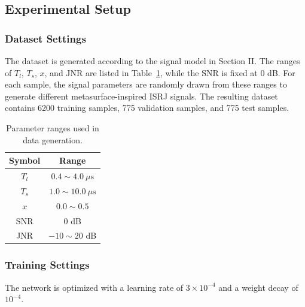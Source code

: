 \documentclass[conference]{IEEEtran}
\begin{document}
\subsection{Experimental Setup}
\subsubsection{Dataset Settings}
The dataset is generated according to the signal model in Section II. The ranges of $T_l$, $T_s$, $x$, and JNR are listed in Table~\ref{tab:data_ranges}, while the SNR is fixed at $0$ dB. For each sample, the signal parameters are randomly drawn from these ranges to generate different metasurface-inspired ISRJ signals. The resulting dataset contains 6200 training samples, 775 validation samples, and 775 test samples.

\begin{table}[!t]
\centering
\caption{Parameter ranges used in data generation.}
\label{tab:data_ranges}
\begin{tabular}{cc}
\toprule
Symbol & Range \\
\midrule
$T_l$ & $0.4\!\sim\!4.0~\mu\text{s}$ \\
$T_s$ & $1.0\!\sim\!10.0~\mu\text{s}$ \\
$x$ & $0.0\!\sim\!0.5$ \\
SNR & $0$ dB \\
JNR & $-10\!\sim\!20$ dB \\
\bottomrule
\end{tabular}
\end{table}

\subsubsection{Training Settings}
The network is optimized with a learning rate of $3\times 10^{-4}$ and a weight decay of $10^{-4}$.
\end{document}
